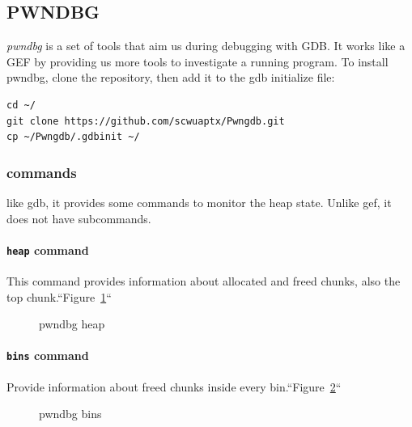 \documentclass{masterthesis}
\begin{document}
\subsection{PWNDBG}
\emph{pwndbg} is a set of tools that aim us during debugging with GDB. It works like a GEF by providing us more tools to investigate a running program.
To install pwndbg, clone the repository, then add it to the gdb initialize file:
\begin{lstlisting}[frame=tlrb]
cd ~/
git clone https://github.com/scwuaptx/Pwngdb.git
cp ~/Pwngdb/.gdbinit ~/
\end{lstlisting}
\subsubsection{commands}
like gdb, it provides some commands to monitor the heap state. Unlike gef, it does not have subcommands.

\paragraph{\lstinline{heap} command}
This command provides information about allocated and freed chunks, also the top chunk.``Figure~\ref{fig:pwnheap}``

\begin{figure}[h!]
\caption{pwndbg heap}
\label{fig:pwnheap}
\end{figure}

\paragraph{\lstinline{bins} command}
Provide information about freed chunks inside every bin.``Figure~\ref{fig:pwnbins}``

\begin{figure}[h!]
\caption{pwndbg bins}
\label{fig:pwnbins}
\end{figure}
\end{document}
